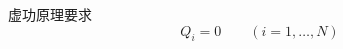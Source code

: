 
\begin{issues}
\issueDraft
\end{issues}


虚功原理要求
\begin{equation}
Q_i = 0 \qquad (i = 1,\dots,N)
\end{equation}
